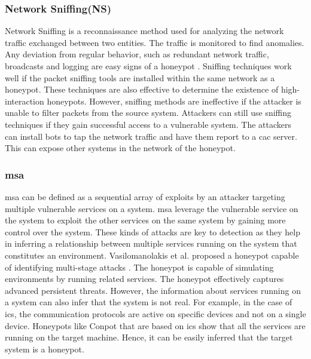 \subsubsection{Network Sniffing(NS)}
Network Sniffing is a reconnaissance method used for analyzing the network traffic exchanged between two entities. The traffic is monitored to find anomalies. Any deviation from regular behavior, such as redundant network traffic, broadcasts and logging are easy signs of a honeypot . Sniffing techniques work well if the packet sniffing tools are installed within the same network as a honeypot. These techniques are also effective to determine the existence of high-interaction honeypots. However, sniffing methods are ineffective if the attacker is unable to filter packets from the source system. Attackers can still use sniffing techniques if they gain successful access to a vulnerable system. The attackers can install bots to tap the network traffic and have them report to a \acrshort{cac}  server. This can expose other systems in the network of the honeypot. 

\subsubsection{\acrfull{msa}}
\acrlong{msa} can be defined as a sequential array of exploits by an attacker targeting multiple vulnerable services on a system. \acrshort{msa} leverage the vulnerable service on the system to exploit the other services on the same system by gaining more control over the system. These kinds of attacks are key to detection as they help in inferring a relationship between multiple services running on the system that constitutes an environment. Vasilomanolakis et al. proposed a honeypot capable of identifying multi-stage attacks  \cite{vasilomanolakis}. The honeypot is capable of simulating environments by running related services. The honeypot effectively captures advanced persistent threats. However, the information about services running on a system can also infer that the system is not real. For example, in the case of \acrshort{ics}, the communication protocols are active on specific devices and not on a single device. Honeypots like Conpot that are based on \acrshort{ics} show that all the services are running on the target machine. Hence, it can be easily inferred that the target system is a honeypot. 

